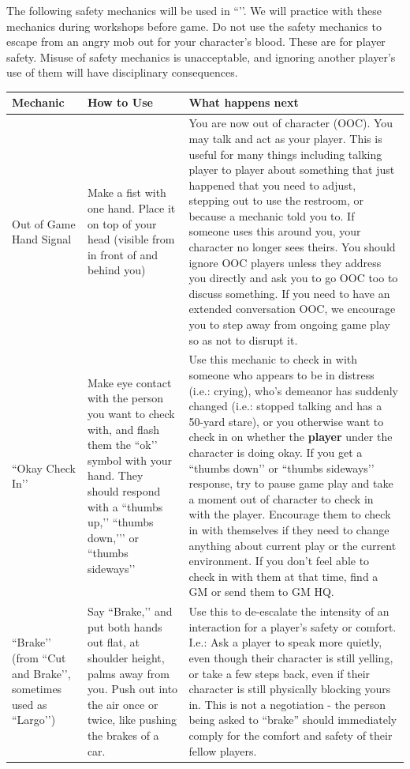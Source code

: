 \documentclass[sheet]{GL2020}
\begin{document}
The following safety mechanics will be used in ``\gamename{}’’. We will practice with these mechanics during workshops before game. Do not use the safety mechanics to escape from an angry mob out for your character’s blood. These are for player safety. Misuse of safety mechanics is unacceptable, and ignoring another player’s use of them will have disciplinary consequences.

\begin{tabularx}{\textwidth}{|>{\centering\arraybackslash} m{1.5cm} | >{\centering\arraybackslash} m{1.8cm} | >{\centering\arraybackslash} X|}
\hline 
 \textbf{Mechanic} & \textbf{How to Use} & \textbf{What happens next} \\
\hline
Out of Game Hand Signal & Make a fist with one hand. Place it on top of your head (visible from in front of and behind you) & You are now out of character (OOC). You may talk and act as your player. This is useful for many things including talking player to player about something that just happened that you need to adjust, stepping out to use the restroom, or because a mechanic told you to. If someone uses this around you, your character no longer sees theirs. You should ignore OOC players unless they address you directly and ask you to go OOC too to discuss something. If you need to have an extended conversation OOC, we encourage you to step away from ongoing game play so as not to disrupt it. \\
    \hline
``Okay Check In’’ & Make eye contact with the person you want to check with, and flash them the ``ok’’ symbol with your hand. They should respond with a ``thumbs up,’’ ``thumbs down,’’’ or ``thumbs sideways’’ & Use this mechanic to check in with someone who appears to be in distress (i.e.: crying), who’s demeanor has suddenly changed (i.e.: stopped talking and has a 50-yard stare), or you otherwise want to check in on whether the \textbf{player} under the character is doing okay. If you get a ``thumbs down’’ or ``thumbs sideways’’ response, try to pause game play and take a moment out of character to check in with the player. Encourage them to check in with themselves if they need to change anything about current play or the current environment. If you don’t feel able to check in with them at that time, find a GM or send them to GM HQ.\\
    \hline
``Brake’’ (from ``Cut and Brake’’, sometimes used as ``Largo’’) & Say ``Brake,’’ and put both hands out flat, at shoulder height, palms away from you. Push out into the air once or twice, like pushing the brakes of a car. & Use this to de-escalate the intensity of an interaction for a player’s safety or comfort. I.e.: Ask a player to speak more quietly, even though their character is still yelling, or take a few steps back, even if their character is still physically blocking yours in. This is not a negotiation - the person being asked to ``brake'' should immediately comply for the comfort and safety of their fellow players. \\

\end{tabularx}
\end{document}
